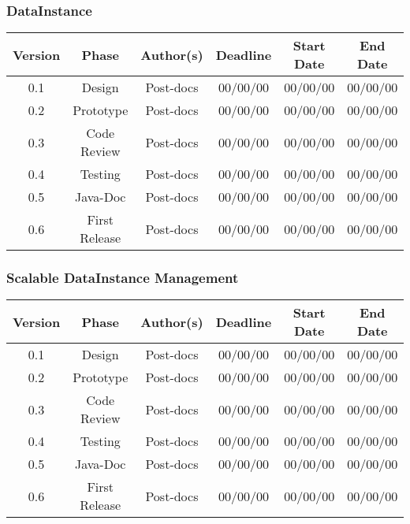 \subsubsection*{DataInstance}


\begin{table}[H]
\begin{tabular}{cccccc}
\hline
\textbf{Version} & \textbf{Phase} & \textbf{Author(s)} & \textbf{Deadline} & \textbf{Start Date} & \textbf{End Date}\\
\hline
0.1 & Design & Post-docs & 00/00/00 & 00/00/00 & 00/00/00\\
\hline 
0.2 & Prototype & Post-docs & 00/00/00 & 00/00/00 & 00/00/00\\
\hline 
0.3 & Code Review & Post-docs & 00/00/00 & 00/00/00 & 00/00/00\\
\hline 
0.4 & Testing & Post-docs & 00/00/00 & 00/00/00 & 00/00/00\\
\hline 
0.5 & Java-Doc  & Post-docs & 00/00/00 & 00/00/00 & 00/00/00\\
\hline 
0.6 & First Release & Post-docs & 00/00/00 & 00/00/00 & 00/00/00\\
\hline
\end{tabular}
\end{table}

\subsubsection*{Scalable DataInstance Management}

\begin{table}[H]
\begin{tabular}{cccccc}
\hline
\textbf{Version} & \textbf{Phase} & \textbf{Author(s)} & \textbf{Deadline} & \textbf{Start Date} & \textbf{End Date}\\
\hline
0.1 & Design & Post-docs & 00/00/00 & 00/00/00 & 00/00/00\\
\hline 
0.2 & Prototype & Post-docs & 00/00/00 & 00/00/00 & 00/00/00\\
\hline 
0.3 & Code Review & Post-docs & 00/00/00 & 00/00/00 & 00/00/00\\
\hline 
0.4 & Testing & Post-docs & 00/00/00 & 00/00/00 & 00/00/00\\
\hline 
0.5 & Java-Doc  & Post-docs & 00/00/00 & 00/00/00 & 00/00/00\\
\hline 
0.6 & First Release & Post-docs & 00/00/00 & 00/00/00 & 00/00/00\\
\hline
\end{tabular}
\end{table}